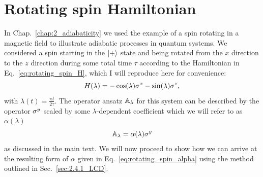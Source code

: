 \appendix

\chapter{Rotating spin Hamiltonian}\label{app:rotating_spin_hamiltonian}

In Chap.~\ref{chap:2_adiabaticity} we used the example of a spin rotating in a magnetic field to illustrate adiabatic processes in quantum systems. We considered a spin starting in the $\ket{+}$ state and being rotated from the $x$ direction to the $z$ direction during some total time $\tau$ according to the Hamiltonian in Eq.~\eqref{eq:rotating_spin_H}, which I will reproduce here for convenience:
\begin{equation}\label{eq:rotating_spin_H_lambda_2}
    H(\lambda) = -\cos(\lambda)\sigma^x - \sin(\lambda)\sigma^z,
\end{equation}
with $\lambda(t) = \frac{\pi t}{2 \tau}$. The  operator ansatz $\mathbb{A}_{\lambda}$ for this system can be described by the operator $\sigma^y$ scaled by some $\lambda$-dependent coefficient which we will refer to as $\alpha(\lambda)$
\begin{equation}
    \mathbb{A}_{\lambda} = \alpha(\lambda) \sigma^y
\end{equation}
as discussed in the main text. We will now proceed to show how we can arrive at the resulting form of $\alpha$ given in Eq.~\eqref{eq:rotating_spin_alpha} using the  method outlined in Sec.~\ref{sec:2.4.1_LCD}.

